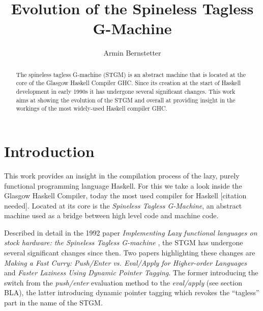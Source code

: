 \documentclass[runningheads]{llncs}
\begin{document}
%
\title{Evolution of the Spineless Tagless G-Machine}
%
%
\author{Armin Bernstetter}
%
%
%
\maketitle              %
%
\begin{abstract}
The spineless tagless G-machine (STGM) is an abstract machine that is located at the core of the Glasgow Haskell Compiler GHC. Since its creation at the start of Haskell development in early 1990s it has undergone several significant changes. This work aims at showing the evolution of the STGM and overall at providing insight in the workings of the most widely-used Haskell compiler GHC.

\end{abstract}
%
%
%

\section{Introduction}

This work provides an insight in the compilation process of the lazy, purely functional programming language Haskell. For this we take a look inside the Glasgow Haskell Compiler, today the most used compiler for Haskell [citation needed]. Located at its core is the \textit{Spineless Tagless G-Machine}, an abstract machine used as a bridge between high level code and machine code.

Described in detail in the 1992 paper \textit{Implementing Lazy functional languages on stock hardware: the Spineless Tagless G-machine} \cite{jones1992implementing}, the STGM has undergone several significant changes since then. Two papers highlighting these changes are \textit{Making a Fast Curry: Push/Enter vs.
Eval/Apply for Higher-order Languages}\cite{marlow2004making} and \textit{Faster Laziness Using Dynamic Pointer Tagging}\cite{marlow2007faster}. The former introducing the switch from the \textit{push/enter} evaluation method to the \textit{eval/apply} (see section BLA), the latter introducing dynamic pointer tagging which revokes the \enquote{tagless} part in the name of the STGM.
\end{document}
